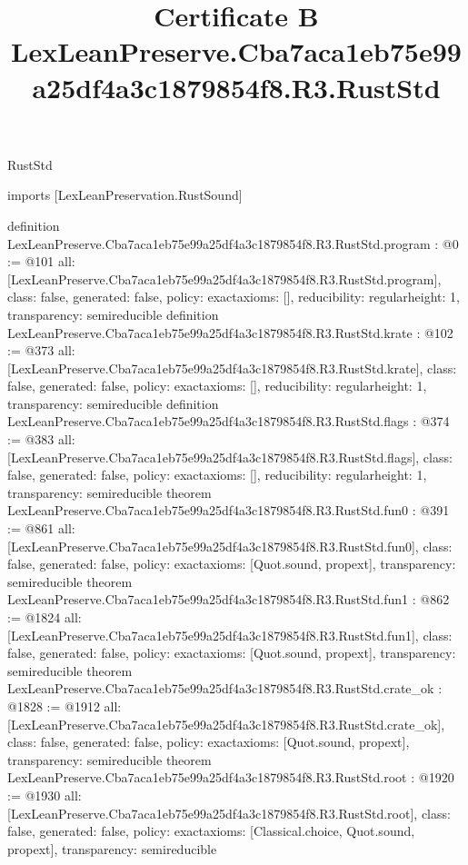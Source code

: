\begin{lexlean}{RustStd}
\title{Certificate B LexLeanPreserve.Cba7aca1eb75e99a25df4a3c1879854f8.R3.RustStd}
\begin{coremodule}
imports [LexLeanPreservation.RustSound]

definition LexLeanPreserve.Cba7aca1eb75e99a25df4a3c1879854f8.R3.RustStd.program : @0 := @101 {
  all: [LexLeanPreserve.Cba7aca1eb75e99a25df4a3c1879854f8.R3.RustStd.program],
  class: false,
  generated: false,
  policy: exact{axioms: []},
  reducibility: regular{height: 1},
  transparency: semireducible
}
definition LexLeanPreserve.Cba7aca1eb75e99a25df4a3c1879854f8.R3.RustStd.krate : @102 := @373 {
  all: [LexLeanPreserve.Cba7aca1eb75e99a25df4a3c1879854f8.R3.RustStd.krate],
  class: false,
  generated: false,
  policy: exact{axioms: []},
  reducibility: regular{height: 1},
  transparency: semireducible
}
definition LexLeanPreserve.Cba7aca1eb75e99a25df4a3c1879854f8.R3.RustStd.flags : @374 := @383 {
  all: [LexLeanPreserve.Cba7aca1eb75e99a25df4a3c1879854f8.R3.RustStd.flags],
  class: false,
  generated: false,
  policy: exact{axioms: []},
  reducibility: regular{height: 1},
  transparency: semireducible
}
theorem LexLeanPreserve.Cba7aca1eb75e99a25df4a3c1879854f8.R3.RustStd.fun0 : @391 := @861 {
  all: [LexLeanPreserve.Cba7aca1eb75e99a25df4a3c1879854f8.R3.RustStd.fun0],
  class: false,
  generated: false,
  policy: exact{axioms: [Quot.sound, propext]},
  transparency: semireducible
}
theorem LexLeanPreserve.Cba7aca1eb75e99a25df4a3c1879854f8.R3.RustStd.fun1 : @862 := @1824 {
  all: [LexLeanPreserve.Cba7aca1eb75e99a25df4a3c1879854f8.R3.RustStd.fun1],
  class: false,
  generated: false,
  policy: exact{axioms: [Quot.sound, propext]},
  transparency: semireducible
}
theorem LexLeanPreserve.Cba7aca1eb75e99a25df4a3c1879854f8.R3.RustStd.crate_ok : @1828 := @1912 {
  all: [LexLeanPreserve.Cba7aca1eb75e99a25df4a3c1879854f8.R3.RustStd.crate_ok],
  class: false,
  generated: false,
  policy: exact{axioms: [Quot.sound, propext]},
  transparency: semireducible
}
theorem LexLeanPreserve.Cba7aca1eb75e99a25df4a3c1879854f8.R3.RustStd.root : @1920 := @1930 {
  all: [LexLeanPreserve.Cba7aca1eb75e99a25df4a3c1879854f8.R3.RustStd.root],
  class: false,
  generated: false,
  policy: exact{axioms: [Classical.choice, Quot.sound, propext]},
  transparency: semireducible
}


\end{coremodule}
\end{lexlean}
